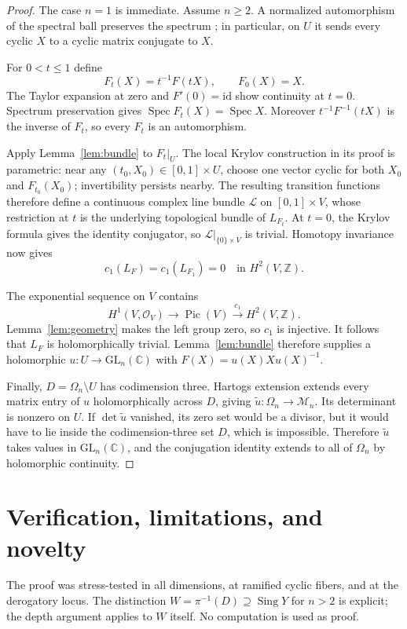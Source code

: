 \documentclass[11pt]{article}
\newcommand{\Om}{\Omega_n}
\newcommand{\M}{\mathcal M_n}
\newcommand{\OO}{\mathcal O}
\newcommand{\C}{\mathbb C}
\newcommand{\GL}{\mathrm{GL}_n(\C)}
\newcommand{\Pic}{\operatorname{Pic}}
\begin{document}
\begin{proof}
The case $n=1$ is immediate.  Assume $n\ge2$.  A normalized automorphism of
the spectral ball preserves the spectrum \cite{RansfordWhite}; in particular,
on $U$ it sends every cyclic $X$ to a cyclic matrix conjugate to $X$.

For $0<t\le1$ define
\[
 F_t(X)=t^{-1}F(tX),
 \qquad F_0(X)=X.
\]
The Taylor expansion at zero and $F'(0)=\mathrm{id}$ show continuity at
$t=0$.  Spectrum preservation gives
$\operatorname{Spec}F_t(X)=\operatorname{Spec}X$.  Moreover
$t^{-1}F^{-1}(tX)$ is the inverse of $F_t$, so every $F_t$ is an automorphism.

Apply Lemma~\ref{lem:bundle} to $F_t|_U$.  The local Krylov construction in
its proof is parametric: near any $(t_0,X_0)\in[0,1]\times U$, choose one
vector cyclic for both $X_0$ and $F_{t_0}(X_0)$; invertibility persists nearby.
The resulting transition functions therefore define a continuous complex
line bundle $\mathcal L$ on $[0,1]\times V$, whose restriction at $t$ is the
underlying topological bundle of $L_{F_t}$.  At $t=0$, the Krylov formula gives
the identity conjugator, so $\mathcal L|_{\{0\}\times V}$ is trivial.
Homotopy invariance now gives
\[
 c_1(L_F)=c_1(L_{F_1})=0\quad\text{in }H^2(V,\mathbb Z).
\]

The exponential sequence on $V$ contains
\[
 H^1(V,\OO_V)\longrightarrow \Pic(V)
   \xrightarrow{c_1} H^2(V,\mathbb Z).
\]
Lemma~\ref{lem:geometry} makes the left group zero, so $c_1$ is injective.
It follows that $L_F$ is holomorphically trivial.  Lemma~\ref{lem:bundle}
therefore supplies a holomorphic $u:U\to\GL$ with
$F(X)=u(X)Xu(X)^{-1}$.

Finally, $D=\Om\setminus U$ has codimension three.  Hartogs extension
\cite{GrauertRemmert} extends
every matrix entry of $u$ holomorphically across $D$, giving
$\widetilde u:\Om\to\M$.  Its determinant is nonzero on $U$.  If
$\det\widetilde u$ vanished, its zero set would be a divisor, but it would
have to lie inside the codimension-three set $D$, which is impossible.
Therefore $\widetilde u$ takes values in $\GL$, and the conjugation identity
extends to all of $\Om$ by holomorphic continuity.
\end{proof}

\section{Verification, limitations, and novelty}
The proof was stress-tested in all dimensions, at ramified cyclic fibers, and
at the derogatory locus.  The distinction
$W=\pi^{-1}(D)\supseteq\operatorname{Sing}Y$ for $n>2$ is explicit; the depth
argument applies to $W$ itself.  No computation is used as proof.
\end{document}
